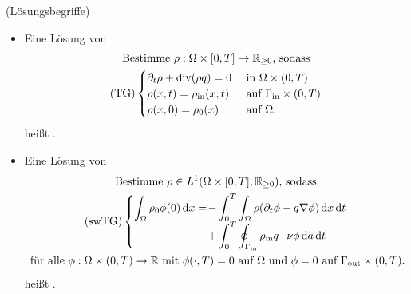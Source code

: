 \begin{define}(Lösungsbegriffe)
	
	\begin{itemize}
		\item Eine Lösung von
		\begin{gather*}
		\text{Bestimme } \rho: \Omega \times [0,T] \to \mathbb{R}_{\geq 0} \text{, sodass}\\
		\operatorname{(TG)}
		\begin{cases}
		\partial_t \rho + \operatorname{div}(\rho q) = 0 &\text{ in } \Omega \times (0,T)\\
		\rho(x,t) = \rho_{\text{in}}(x,t) &\text{ auf } \Gamma_{{\text{in}}} \times (0,T)\\
		\rho(x,0) = \rho_0(x) &\text{ auf } \Omega.
		\end{cases}
		\end{gather*}
		heißt .
		\item Eine Lösung von 
		\begin{gather*} 
		\text{Bestimme } \rho \in L^1(\Omega \times [0,T], \R_{\geq 0}) \text{, sodass}\\
		\swlTG
		\begin{cases}
		\displaystyle
		\int_{\Omega} \rho_0 \phi(0) \diff x = \mkern-16mu &- \displaystyle \int_{0}^{T} \int_{\Omega} \rho (\partial_t \phi - q \nabla \phi ) \diff x \diff t \\
		&+\displaystyle\int_{0}^{T}  \oint_{\Gammain} \rhoin q \cdot \nu \phi \diff a  \diff t
		\end{cases}	\\
		\text{ für alle } \phi: \Omega \times (0,T) \to \R \text{ mit } \phi(\cdot,T) = 0 \text{ auf } \Omega \text{ und } \phi = 0 \text{ auf } \Gammaout \times (0,T).
		\end{gather*}
		heißt .
	\end{itemize}
\end{define}

